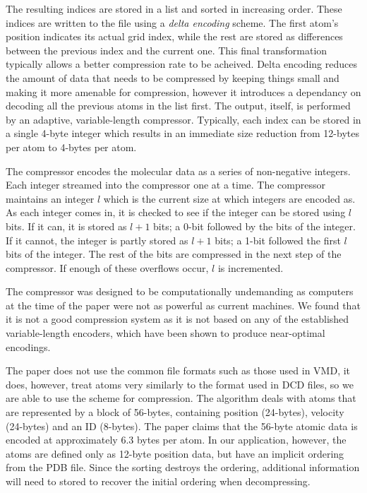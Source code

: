 \documentclass[a4paper,11pt]{report}
\begin{document}
The resulting indices are stored in a list and sorted in increasing order. These indices are written to the file using a \emph{delta encoding} scheme. The first atom's position indicates its actual grid index, while the rest are stored as differences between the previous index and the current one. This final transformation typically allows a better compression rate to be acheived. Delta encoding reduces the amount of data that needs to be compressed by keeping things small and making it more amenable for compression, however it introduces a dependancy on decoding all the previous atoms in the list first. The output, itself, is performed by an adaptive, variable-length compressor. Typically, each index can be stored in a single 4-byte integer which results in an immediate size reduction from 12-bytes per atom to 4-bytes per atom. 

The compressor encodes the molecular data as a series of non-negative integers. Each integer streamed into the compressor one at a time. The compressor maintains an integer $l$ which is the current size at which integers are encoded as. As each integer comes in, it is checked to see if the integer can be stored using $l$ bits. If it can, it is stored as $l+1$ bits; a 0-bit followed by the bits of the integer. If it cannot, the integer is partly stored as $l+1$ bits; a 1-bit followed the first $l$ bits of the integer. The rest of the bits are compressed in the next step of the compressor. If enough of these overflows occur, $l$ is incremented.

The compressor was designed to be computationally undemanding as computers at the time of the paper were not as powerful as current machines. We found that it is not a good compression system as it is not based on any of the established variable-length encoders, which have been shown to produce near-optimal encodings.

The paper does not use the common file formats such as those used in VMD, it does, however, treat atoms very similarly to the format used in DCD files, so we are able to use the scheme for compression. The algorithm deals with atoms that are represented by a block of 56-bytes, containing position (24-bytes), velocity (24-bytes) and an ID (8-bytes). The paper claims that the 56-byte atomic data is encoded at approximately 6.3 bytes per atom. In our application, however, the atoms are defined only as 12-byte position data, but have an implicit ordering from the PDB file. Since the sorting destroys the ordering, additional information will need to stored to recover the initial ordering when decompressing.
\end{document}
